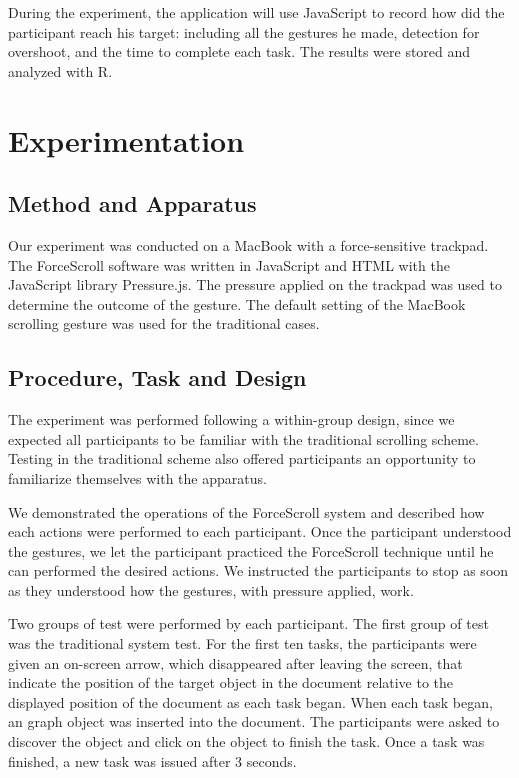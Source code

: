 \documentclass{sigchi}
\begin{document}
During the experiment, the application will use JavaScript to record how did the participant reach his target: including all the gestures he made, detection for overshoot, and the time to complete each task. The results were stored and analyzed with R.


\section{Experimentation}
\subsection{Method and Apparatus}
Our experiment was conducted on a MacBook with a force-sensitive trackpad. The ForceScroll software was written in JavaScript and HTML with the JavaScript library Pressure.js. The pressure applied on the trackpad was used to determine the outcome of the gesture. The default setting of the MacBook scrolling gesture was used for the traditional cases.
\subsection{Procedure, Task and Design}
The experiment was performed following a within-group design, since we expected all participants to be familiar with the traditional scrolling scheme. Testing in the traditional scheme also offered participants an opportunity to familiarize themselves with the apparatus.

We demonstrated the operations of the ForceScroll system and described how each actions were performed to each participant. Once the participant understood the gestures, we let the participant practiced the ForceScroll technique until he can performed the desired actions. We instructed the participants to stop as soon as they understood how the gestures, with pressure applied, work.

Two groups of test were performed by each participant. The first group of test was the traditional system test. For the first ten tasks, the participants were given an on-screen arrow, which disappeared after leaving the screen, that indicate the position of the target object in the document relative to the displayed position of the document as each task began. When each task began, an graph object was inserted into the document. The participants were asked to discover the object and click on the object to finish the task. Once a task was finished, a new task was issued after 3 seconds. 
\end{document}

